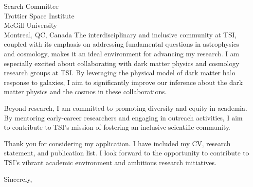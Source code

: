 \documentclass[11pt]{letter}
\begin{document}
\begin{letter}{Search Committee \\ Trottier Space Institute \\ McGill University \\ Montreal, QC, Canada}
The interdisciplinary and inclusive community at TSI, coupled with its emphasis on addressing fundamental questions in astrophysics and cosmology, makes it an ideal environment for advancing my research. I am especially excited about collaborating with dark matter physics and cosmology research groups at TSI. By leveraging the physical model of dark matter halo response to galaxies, I aim to significantly improve our inference about the dark matter physics and the cosmos in these collaborations.

Beyond research, I am committed to promoting diversity and equity in academia. By mentoring early-career researchers and engaging in outreach activities, I aim to contribute to TSI's mission of fostering an inclusive scientific community.

Thank you for considering my application. I have included my CV, research statement, and publication list. I look forward to the opportunity to contribute to TSI's vibrant academic environment and ambitious research initiatives.

\closing{Sincerely,}

\end{letter}
\end{document}
